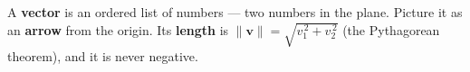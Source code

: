 \documentclass[10pt]{article}
\begin{document}
\vspace{0.10in}

\begin{remindbox}
\small A \textbf{vector} is an ordered list of numbers --- two numbers in the plane. Picture it
as an \textbf{arrow} from the origin. Its \textbf{length} is
$\|\mathbf{v}\|=\sqrt{v_1^{\,2}+v_2^{\,2}}$ (the Pythagorean theorem), and it is never negative.
\end{remindbox}
\end{document}

